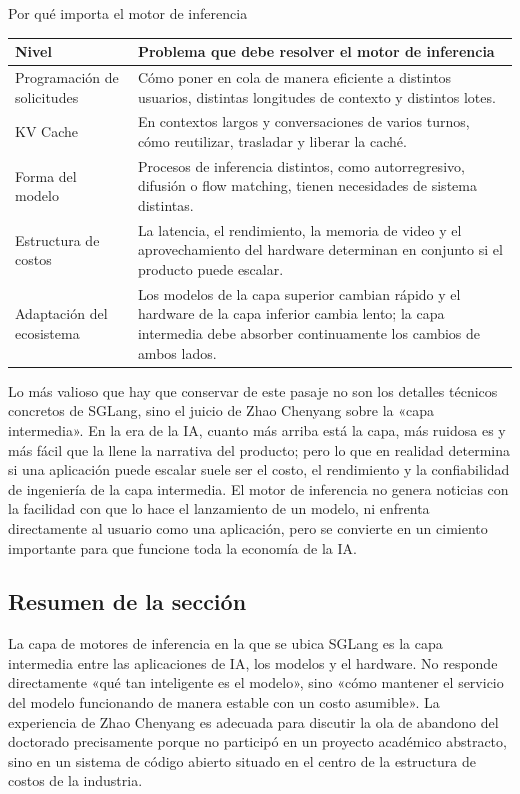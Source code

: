 \documentclass[a4paper]{article}
\begin{document}
\begin{knowledgebox}{Por qué importa el motor de inferencia}
\begin{tabularx}{\textwidth}{>{\raggedright\arraybackslash}p{} Y}
\toprule
Nivel & Problema que debe resolver el motor de inferencia \\
\midrule
Programación de solicitudes & Cómo poner en cola de manera eficiente a distintos usuarios, distintas longitudes de contexto y distintos lotes. \\
KV Cache & En contextos largos y conversaciones de varios turnos, cómo reutilizar, trasladar y liberar la caché. \\
Forma del modelo & Procesos de inferencia distintos, como autorregresivo, difusión o flow matching, tienen necesidades de sistema distintas. \\
Estructura de costos & La latencia, el rendimiento, la memoria de video y el aprovechamiento del hardware determinan en conjunto si el producto puede escalar. \\
Adaptación del ecosistema & Los modelos de la capa superior cambian rápido y el hardware de la capa inferior cambia lento; la capa intermedia debe absorber continuamente los cambios de ambos lados. \\
\bottomrule
\end{tabularx}
\end{knowledgebox}

Lo más valioso que hay que conservar de este pasaje no son los detalles técnicos concretos de SGLang, sino el juicio de Zhao Chenyang sobre la «capa intermedia». En la era de la IA, cuanto más arriba está la capa, más ruidosa es y más fácil que la llene la narrativa del producto; pero lo que en realidad determina si una aplicación puede escalar suele ser el costo, el rendimiento y la confiabilidad de ingeniería de la capa intermedia. El motor de inferencia no genera noticias con la facilidad con que lo hace el lanzamiento de un modelo, ni enfrenta directamente al usuario como una aplicación, pero se convierte en un cimiento importante para que funcione toda la economía de la IA.

\subsection{Resumen de la sección}

La capa de motores de inferencia en la que se ubica SGLang es la capa intermedia entre las aplicaciones de IA, los modelos y el hardware. No responde directamente «qué tan inteligente es el modelo», sino «cómo mantener el servicio del modelo funcionando de manera estable con un costo asumible». La experiencia de Zhao Chenyang es adecuada para discutir la ola de abandono del doctorado precisamente porque no participó en un proyecto académico abstracto, sino en un sistema de código abierto situado en el centro de la estructura de costos de la industria.
\end{document}
